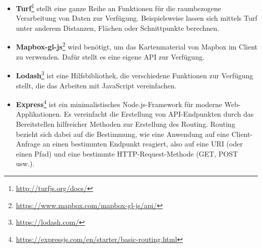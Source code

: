     \begin{itemize}[label={}]
      \item \textbf{Turf}\footnote{\url{http://turfjs.org/docs/}} stellt eine ganze Reihe an Funktionen für die raumbezogene Verarbeitung von Daten zur Verfügung. Beispielsweise lassen sich mittels Turf unter anderem Distanzen, Flächen oder Schnittpunkte berechnen.

      \item \textbf{Mapbox-gl-js}\footnote{\url{https://www.mapbox.com/mapbox-gl-js/api/}} wird benötigt, um das Kartenmaterial von Mapbox im Client zu verwenden. Dafür stellt es eine eigene API zur Verfügung.

      \item \textbf{Lodash}\footnote{\url{https://lodash.com/}} ist eine Hilfsbibliothek, die verschiedene Funktionen zur Verfügung stellt, die das Arbeiten mit JavaScript vereinfachen.

      \item \textbf{Express}\footnote{\url{https://expressjs.com/en/starter/basic-routing.html}} ist ein minimalistisches Node.js-Framework für moderne Web-Applikationen. Es vereinfacht die Erstellung von API-Endpunkten durch das Bereitstellen hilfreicher Methoden zur Erstellung des Routing. Routing bezieht sich dabei auf die Bestimmung, wie eine Anwendung auf eine Client-Anfrage an einen bestimmten Endpunkt reagiert, also auf eine URI (oder einen Pfad) und eine bestimmte HTTP-Request-Methode (GET, POST usw.).
    \end{itemize}
    
